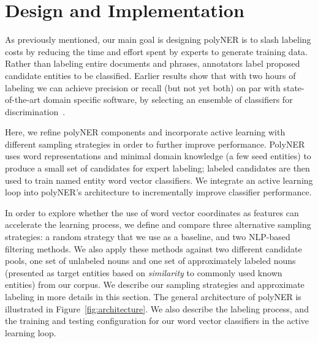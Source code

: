 \section{Design and Implementation}
\label{sect:apner_architecture}
As previously mentioned, our main goal is designing polyNER is to slash labeling costs by reducing the time and effort spent by experts to generate training data. 
Rather than labeling entire documents and phrases, annotators label proposed candidate entities to be classified.
Earlier results show that with two hours of labeling we can achieve
precision or recall (but not yet both) on par with state-of-the-art domain specific software, by selecting an ensemble of classifiers for discrimination~\cite{tchoua2019polyner}. %

Here, we refine polyNER components and incorporate active learning with different sampling strategies in order to further improve performance.
PolyNER uses word representations and minimal domain knowledge (a few
seed entities) to produce a small set of candidates for expert labeling;
labeled candidates are then used to train named entity word vector classifiers.
We integrate an active learning loop into polyNER's architecture to incrementally improve classifier performance.

In order to explore whether the use of word vector coordinates as features can accelerate the learning process,
we define and compare three alternative sampling strategies: a random strategy that we use as a baseline,
and two NLP-based filtering methods. 
We also apply these methods against two different candidate pools, 
one set of unlabeled nouns and one set of approximately labeled nouns (presented as target entities based on \textit{similarity} to commonly used known entities) from our corpus.
We describe our sampling strategies and approximate labeling in more details in this section.
The general architecture of polyNER is illustrated in Figure~\ref{fig:architecture}.
We also describe the labeling process, and the training and testing configuration for our word vector classifiers in the active learning loop. 

